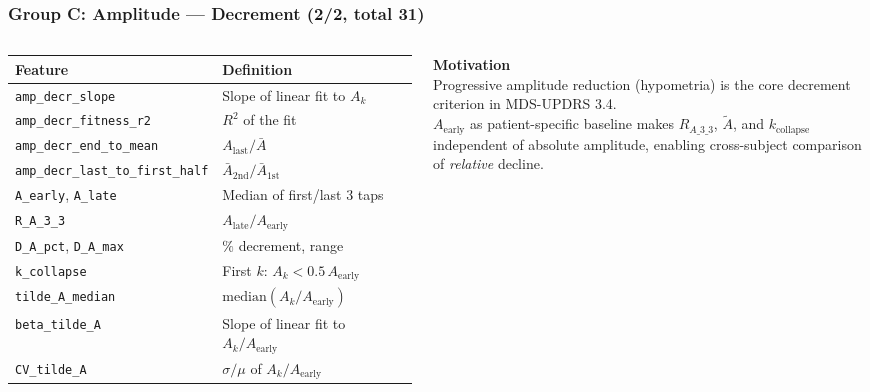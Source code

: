 \documentclass[aspectratio=169]{beamer}
\begin{document}
\begin{frame}
    \frametitle{Group C: Amplitude --- Decrement (2/2, total 31)}
    \scriptsize
    \begin{columns}[T]
        \renewcommand{\arraystretch}{1.1}
        \begin{tabular}{p{4.2cm}p{2.8cm}}
            \toprule
            \textbf{Feature} & \textbf{Definition} \\
            \midrule
            \texttt{amp\_decr\_slope} & Slope of linear fit to $A_k$ \\
            \texttt{amp\_decr\_fitness\_r2} & $R^2$ of the fit \\
            \texttt{amp\_decr\_end\_to\_mean} & $A_\text{last}/\bar{A}$ \\
            \texttt{amp\_decr\_last\_to\_first\_half} & $\bar{A}_\text{2nd}/\bar{A}_\text{1st}$ \\
            \midrule
            \texttt{A\_early}, \texttt{A\_late} & Median of first/last 3 taps \\
            \texttt{R\_A\_3\_3} & $A_\text{late}/A_\text{early}$ \\
            \texttt{D\_A\_pct}, \texttt{D\_A\_max} & $\%$ decrement, range \\
            \texttt{k\_collapse} & First $k$: $A_k < 0.5\,A_\text{early}$ \\
            \midrule
            \texttt{tilde\_A\_median} & $\mathrm{median}(A_k/A_\text{early})$ \\
            \texttt{beta\_tilde\_A} & Slope of linear fit to $A_k/A_\text{early}$ \\
            \texttt{CV\_tilde\_A} & $\sigma/\mu$ of $A_k/A_\text{early}$ \\
            \bottomrule
        \end{tabular}

        \textbf{Motivation}\\[0.3em]
        Progressive amplitude reduction (hypometria) is the core decrement criterion in MDS-UPDRS 3.4.\\[0.4em]
        $A_\text{early}$ as patient-specific baseline makes $R_{A\_3\_3}$, $\tilde{A}$, and $k_\text{collapse}$ independent of absolute amplitude, enabling cross-subject comparison of \emph{relative} decline.
    \end{columns}
\end{frame}
\end{document}
